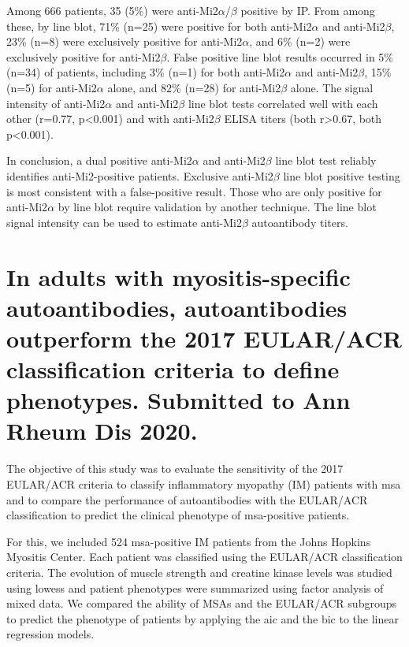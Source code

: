 Among 666 patients, 35 (5\%) were anti-Mi2$\alpha$/$\beta$ positive by IP. From among these, by line blot, 71\% (n=25) were positive for both anti-Mi2$\alpha$ and anti-Mi2$\beta$, 23\% (n=8) were exclusively positive for anti-Mi2$\alpha$, and 6\% (n=2) were exclusively positive for anti-Mi2$\beta$.  False positive line blot results occurred in 5\% (n=34) of patients, including 3\% (n=1) for both anti-Mi2$\alpha$ and anti-Mi2$\beta$, 15\% (n=5) for anti-Mi2$\alpha$ alone, and 82\% (n=28) for anti-Mi2$\beta$ alone.  The signal intensity of anti-Mi2$\alpha$ and anti-Mi2$\beta$ line blot tests correlated well with each other (r=0.77, p<0.001) and with anti-Mi2$\beta$ ELISA titers (both r>0.67, both p<0.001).  

In conclusion, a dual positive anti-Mi2$\alpha$ and anti-Mi2$\beta$ line blot test reliably identifies anti-Mi2-positive patients. Exclusive anti-Mi2$\beta$ line blot positive testing is most consistent with a false-positive result. Those who are only positive for anti-Mi2$\alpha$ by line blot require validation by another technique. The line blot signal intensity can be used to estimate anti-Mi2$\beta$ autoantibody titers.



{\cleardoublepage}

\section{In adults with myositis-specific autoantibodies, autoantibodies outperform the 2017 EULAR/ACR classification criteria to define phenotypes. Submitted to Ann Rheum Dis 2020.}
\label{sec:atb_class}

The objective of this study was to evaluate the sensitivity of the 2017 EULAR/ACR criteria to classify inflammatory myopathy (IM) patients with \gls{msa} and to compare the performance of autoantibodies with the EULAR/ACR classification to predict the clinical phenotype of \gls{msa}-positive patients.

For this, we included 524 \gls{msa}-positive IM patients from the Johns Hopkins Myositis Center. Each patient was classified using the EULAR/ACR classification criteria. The evolution of muscle strength and creatine kinase levels was studied using \gls{lowess} and patient phenotypes were summarized using factor analysis of mixed data. We compared the ability of MSAs and the EULAR/ACR subgroups to predict the phenotype of patients by applying the \gls{aic} and the \gls{bic} to the linear regression models.

